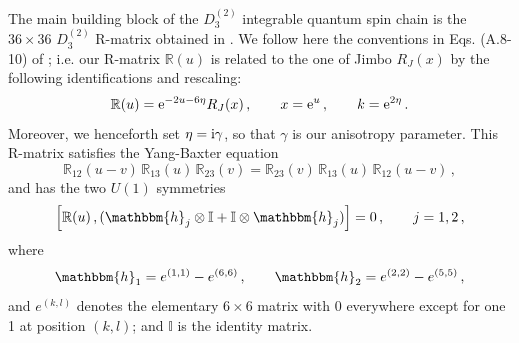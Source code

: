 \documentclass[12pt]{article}
\numberwithin{equation}{section}
\newcommand{\ri}{{\rm i}}
\newcommand{\re}{{\rm e}}
\newcommand{\id}{\mathbb{I}}
\begin{document}
	The main building block of the $D^{(2)}_3$ integrable quantum spin chain is the $36 \times 36$ $D^{(2)}_3$ R-matrix obtained in \cite{Jimb86}. We follow here the conventions in Eqs. (A.8-10) of \cite{NePR17}; i.e.
	our R-matrix $\mathbb{R}(u)$ is related to the one of Jimbo $R_{J}(x)$ \cite{Jimb86} by the following identifications and rescaling:
	\begin{align}
		\mathbb{R}(u)=\re^{-2u-6\eta}R_{J}(x)\,, \qquad  x=\re^u\,, \qquad k=\re^{2\eta} \,.
	\end{align}
	Moreover, we henceforth set $\eta = \ri \gamma$, 
	so that  $\gamma$ is our anisotropy parameter.
	This R-matrix satisfies the Yang-Baxter equation
	\begin{equation}
		\mathbb{R}_{12}(u-v)\, \mathbb{R}_{13}(u)\, \mathbb{R}_{23}(v) = \mathbb{R}_{23}(v)\,
		\mathbb{R}_{13}(u)\, 
		\mathbb{R}_{12}(u-v)\,,
		\label{YBE}
	\end{equation}
	and has the two $U(1)$ symmetries
	\begin{equation}
		\left[\mathbb{R}(u) \,, (\mathbbm{h}_j \otimes \id + \id \otimes \mathbbm{h}_j) \right] = 0 \,, \qquad j = 1, 2\,, 
		\label{RU1}
	\end{equation}
	where 
	\begin{equation}
		\mathbbm{h}_1 = e^{(1,1)} - e^{(6,6)} \,, \qquad
		\mathbbm{h}_2 = e^{(2,2)} - e^{(5,5)} \,,
		\label{U1gens}
	\end{equation}
	and $e^{(k,l)}$ denotes the elementary $6 \times 6$ matrix with 0 everywhere except for one 1 at position $(k,l)$; and $\id$ is the identity matrix.
	
\end{document}
